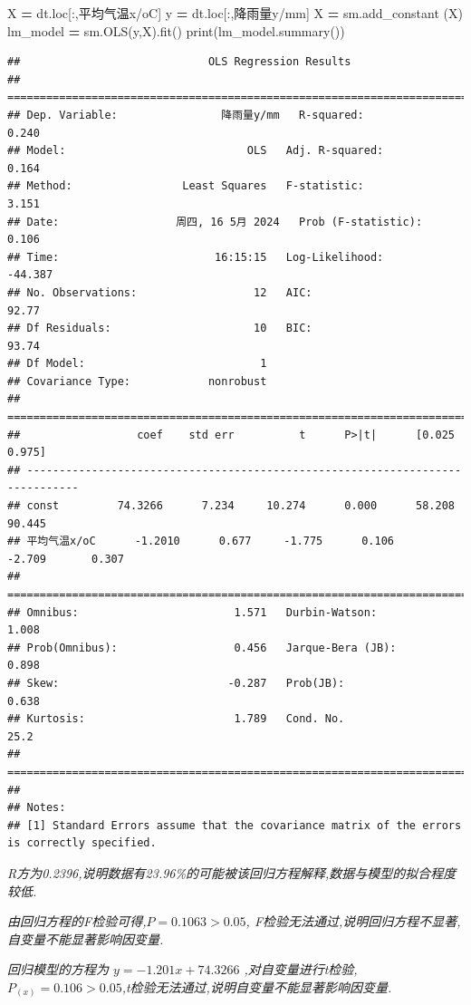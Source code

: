 \documentclass[
]{article}
\newenvironment{Shaded}{\begin{snugshade}}{\end{snugshade}}
\newcommand{\BuiltInTok}[1]{#1}
\newcommand{\NormalTok}[1]{#1}
\newcommand{\OperatorTok}[1]{\textcolor[rgb]{0.81,0.36,0.00}{\textbf{#1}}}
\newcommand{\StringTok}[1]{\textcolor[rgb]{0.31,0.60,0.02}{#1}}
\begin{document}
\begin{Shaded}
\begin{Highlighting}[]
\NormalTok{X }\OperatorTok{=}\NormalTok{ dt.loc[:,}\StringTok{\textquotesingle{}平均气温x/oC\textquotesingle{}}\NormalTok{]}
\NormalTok{y }\OperatorTok{=}\NormalTok{ dt.loc[:,}\StringTok{\textquotesingle{}降雨量y/mm\textquotesingle{}}\NormalTok{]}
\NormalTok{X }\OperatorTok{=}\NormalTok{ sm.add\_constant (X)}
\NormalTok{lm\_model }\OperatorTok{=}\NormalTok{ sm.OLS(y,X).fit()}
\BuiltInTok{print}\NormalTok{(lm\_model.summary())}
\end{Highlighting}
\end{Shaded}

\begin{verbatim}
##                             OLS Regression Results                            
## ==============================================================================
## Dep. Variable:                降雨量y/mm   R-squared:                       0.240
## Model:                            OLS   Adj. R-squared:                  0.164
## Method:                 Least Squares   F-statistic:                     3.151
## Date:                  周四, 16 5月 2024   Prob (F-statistic):              0.106
## Time:                        16:15:15   Log-Likelihood:                -44.387
## No. Observations:                  12   AIC:                             92.77
## Df Residuals:                      10   BIC:                             93.74
## Df Model:                           1                                         
## Covariance Type:            nonrobust                                         
## ==============================================================================
##                  coef    std err          t      P>|t|      [0.025      0.975]
## ------------------------------------------------------------------------------
## const         74.3266      7.234     10.274      0.000      58.208      90.445
## 平均气温x/oC      -1.2010      0.677     -1.775      0.106      -2.709       0.307
## ==============================================================================
## Omnibus:                        1.571   Durbin-Watson:                   1.008
## Prob(Omnibus):                  0.456   Jarque-Bera (JB):                0.898
## Skew:                          -0.287   Prob(JB):                        0.638
## Kurtosis:                       1.789   Cond. No.                         25.2
## ==============================================================================
## 
## Notes:
## [1] Standard Errors assume that the covariance matrix of the errors is correctly specified.
\end{verbatim}

\emph{R方为0.2396,说明数据有23.96\%的可能被该回归方程解释,数据与模型的拟合程度较低.}

\emph{由回归方程的F检验可得,\(P = 0.1063 > 0.05\),
F检验无法通过,说明回归方程不显著,自变量不能显著影响因变量.}

\emph{回归模型的方程为 \(y = -1.201x + 74.3266\)
,对自变量进行t检验,\(P_{(x)} = 0.106 > 0.05\),t检验无法通过,说明自变量不能显著影响因变量.}
\end{document}
